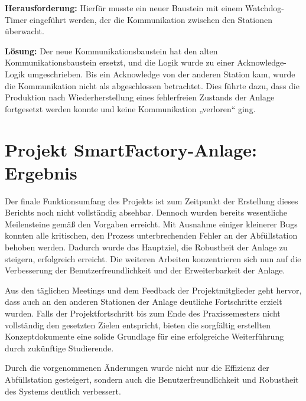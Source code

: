 \textbf{Herausforderung:}  
Hierfür musste ein neuer Baustein mit einem Watchdog-Timer eingeführt werden, der die Kommunikation zwischen den Stationen überwacht.

\textbf{Lösung:}  
Der neue Kommunikationsbaustein hat den alten Kommunikationsbaustein ersetzt, und die Logik wurde zu einer Acknowledge-Logik umgeschrieben. 
Bis ein Acknowledge von der anderen Station kam, wurde die Kommunikation nicht als abgeschlossen betrachtet. Dies führte dazu, dass die 
Produktion nach Wiederherstellung eines fehlerfreien Zustands der Anlage fortgesetzt werden konnte und keine Kommunikation „verloren“ ging.

\section{Projekt SmartFactory-Anlage: Ergebnis}

Der finale Funktionsumfang des Projekts ist zum Zeitpunkt der Erstellung dieses Berichts noch nicht vollständig absehbar. Dennoch wurden bereits 
wesentliche Meilensteine gemäß den Vorgaben erreicht. Mit Ausnahme einiger kleinerer Bugs konnten alle kritischen, den Prozess unterbrechenden 
Fehler an der Abfüllstation behoben werden. Dadurch wurde das Hauptziel, die Robustheit der Anlage zu steigern, erfolgreich erreicht. Die 
weiteren Arbeiten konzentrieren sich nun auf die Verbesserung der Benutzerfreundlichkeit und der Erweiterbarkeit der Anlage.

Aus den täglichen Meetings und dem Feedback der Projektmitglieder geht hervor, dass auch an den anderen Stationen der Anlage deutliche 
Fortschritte erzielt wurden. Falls der Projektfortschritt bis zum Ende des Praxissemesters nicht vollständig den gesetzten Zielen entspricht, 
bieten die sorgfältig erstellten Konzeptdokumente eine solide Grundlage für eine erfolgreiche Weiterführung durch zukünftige Studierende.

Durch die vorgenommenen Änderungen wurde nicht nur die Effizienz der Abfüllstation gesteigert, sondern auch die Benutzerfreundlichkeit und 
Robustheit des Systems deutlich verbessert.


